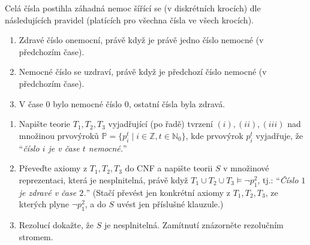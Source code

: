 \documentclass[a4paper,12pt]{article}
\begin{document}
\medskip\begin{problem}
    Celá čísla postihla záhadná nemoc šířící se (v diskrétních krocích) dle následujících pravidel (platících pro všechna čísla ve všech krocích).
    \begin{enumerate}[label=(\roman*)]\it
    \item Zdravé číslo onemocní, právě když je právě jedno číslo nemocné (v předchozím čase).
    \item Nemocné číslo se uzdraví, právě když je předchozí číslo nemocné (v předchozím čase).
    \item V čase $0$ bylo nemocné číslo $0$, ostatní čísla byla zdravá.
    \end{enumerate}
    \begin{enumerate}
    \item Napište teorie $T_1, T_2, T_3$ vyjadřující (po řadě) tvrzení $(i), (ii), (iii)$ nad množinou prvovýroků $\mathbb{P}=\{p_i^t \mid i\in\mathbb{Z}, t\in\mathbb{N}_0\}$, kde prvovýrok $p_i^t$ vyjadřuje, že ``{\it číslo $i$ je v čase $t$ nemocné.}''
    \item Převeďte axiomy z $T_1, T_2, T_3$ do CNF a napište teorii $S$ v množinové reprezentaci, která je nesplnitelná, právě když $T_1 \cup T_2 \cup T_3 \models \neg p_1^2$, tj.: ``{\it Číslo $1$ je zdravé v čase $2$.}'' (Stačí převést jen konkrétní axiomy z $T_1,T_2,T_3$, ze kterých plyne $\neg p_1^2$, a do $S$ uvést jen příslušné klauzule.)
    \item Rezolucí dokažte, že $S$ je nesplnitelná. Zamítnutí znázorněte rezolučním stromem.
    \end{enumerate}
\end{problem}

 
\end{document}
